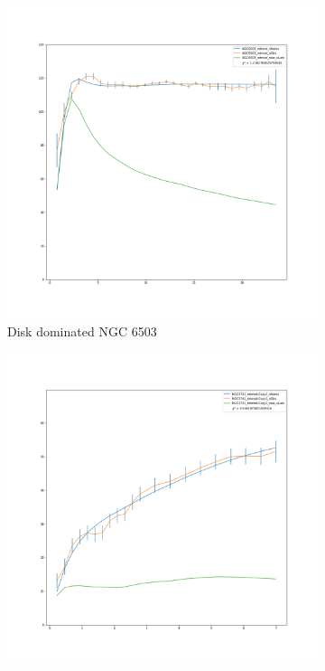 \documentclass[reprint,%
 amsmath,amssymb,
 aps,
]{revtex4-1}
\begin{document}
\begin{figure}[ht] 
  \begin{subfigure}[b]{0.5\linewidth}
    \centering
    \includegraphics[width=0.95\linewidth]{figures/NGC6503_rotmod_XueSofue.png}
    \caption{Disk dominated NGC 6503} 
    \label{fig7:b} 
    \vspace{4ex}
  \end{subfigure} 
  \begin{subfigure}[c]{0.5\linewidth}
    \centering
    \includegraphics[width=0.95\linewidth]{figures/NGC3741_rotmod-Copy1_XueSofue.png} 

\end{subfigure}
\end{figure}
\end{document}
